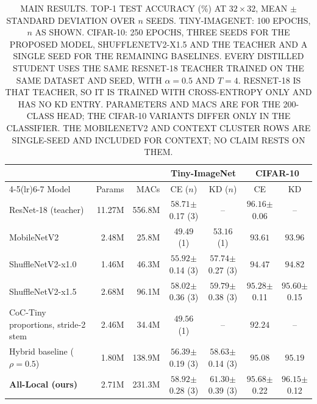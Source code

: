 \begin{table}[!t]
\renewcommand{\arraystretch}{1.15}
\caption{\uppercase{Main results. Top-1 test accuracy (\%) at $32\times32$, mean $\pm$ standard
deviation over $n$ seeds. Tiny-ImageNet: 100 epochs, $n$ as shown. CIFAR-10:
250 epochs, three seeds for the proposed model, ShuffleNetV2-x1.5 and the
teacher and a single seed for the remaining baselines. Every distilled student uses the same ResNet-18
teacher trained on the same dataset and seed, with $\alpha = 0.5$ and $T = 4$.
ResNet-18 is that teacher, so it is trained with cross-entropy only and has no
KD entry. Parameters and MACs are for the 200-class head; the CIFAR-10
variants differ only in the classifier. The MobileNetV2 and Context Cluster
rows are single-seed and included for context; no claim rests on them.}}
\label{tab:main}
\centering
\footnotesize
\begin{tabular}{@{}lrrcccc@{}}
\toprule
& & & \multicolumn{2}{c}{Tiny-ImageNet} & \multicolumn{2}{c}{CIFAR-10} \\
\cmidrule(lr){4-5}\cmidrule(lr){6-7}
Model & Params & MACs & CE ($n$) & KD ($n$) & CE & KD \\
\midrule
ResNet-18 (teacher) \cite{resnet} & 11.27M & 556.8M & $58.71${\scriptsize$\pm$0.17} (3) & -- & $96.16${\scriptsize$\pm$0.06} & -- \\
MobileNetV2 \cite{mobilenetv2} & 2.48M & 25.8M & $49.49$ (1) & $53.16$ (1) & $93.61$ & $93.96$ \\
ShuffleNetV2-x1.0 \cite{shufflenetv2} & 1.46M & 46.3M & $55.92${\scriptsize$\pm$0.14} (3) & $57.74${\scriptsize$\pm$0.27} (3) & $94.47$ & $94.82$ \\
ShuffleNetV2-x1.5 \cite{shufflenetv2} & 2.68M & 96.1M & $58.02${\scriptsize$\pm$0.36} (3) & $59.79${\scriptsize$\pm$0.38} (3) & $95.28${\scriptsize$\pm$0.11} & $95.60${\scriptsize$\pm$0.15} \\
CoC-Tiny proportions, stride-2 stem \cite{coc} & 2.46M & 34.4M & $49.56$ (1) & -- & $92.24$ & -- \\
Hybrid baseline ($\rho{=}0.5$) & 1.80M & 138.9M & $56.39${\scriptsize$\pm$0.19} (3) & $58.63${\scriptsize$\pm$0.14} (3) & $95.08$ & $95.19$ \\
\midrule
\textbf{All-Local (ours)} & 2.71M & 231.3M & $\mathbf{58.92}${\scriptsize$\pm$0.28} (3) & $\mathbf{61.30}${\scriptsize$\pm$0.39} (3) & $\mathbf{95.68}${\scriptsize$\pm$0.22} & $\mathbf{96.15}${\scriptsize$\pm$0.12} \\
\bottomrule
\end{tabular}
\end{table}

